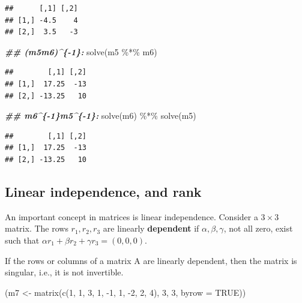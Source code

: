 \documentclass[
  12pt,
]{krantz}
\newenvironment{Shaded}{\begin{snugshade}}{\end{snugshade}}
\newcommand{\AttributeTok}[1]{\textcolor[rgb]{0.77,0.63,0.00}{#1}}
\newcommand{\ConstantTok}[1]{\textcolor[rgb]{0.00,0.00,0.00}{#1}}
\newcommand{\DecValTok}[1]{\textcolor[rgb]{0.00,0.00,0.81}{#1}}
\newcommand{\DocumentationTok}[1]{\textcolor[rgb]{0.56,0.35,0.01}{\textbf{\textit{#1}}}}
\newcommand{\FunctionTok}[1]{\textcolor[rgb]{0.00,0.00,0.00}{#1}}
\newcommand{\NormalTok}[1]{#1}
\newcommand{\OtherTok}[1]{\textcolor[rgb]{0.56,0.35,0.01}{#1}}
\newcommand{\SpecialCharTok}[1]{\textcolor[rgb]{0.00,0.00,0.00}{#1}}
\theoremstyle{definition}
\theoremstyle{definition}
\theoremstyle{definition}
\theoremstyle{definition}
\theoremstyle{remark}
\begin{document}
\begin{verbatim}
##      [,1] [,2]
## [1,] -4.5    4
## [2,]  3.5   -3
\end{verbatim}

\begin{Shaded}
\begin{Highlighting}[]
\DocumentationTok{\#\# (m5m6)\^{}\{{-}1\}:}
\FunctionTok{solve}\NormalTok{(m5 }\SpecialCharTok{\%*\%}\NormalTok{ m6)}
\end{Highlighting}
\end{Shaded}

\begin{verbatim}
##        [,1] [,2]
## [1,]  17.25  -13
## [2,] -13.25   10
\end{verbatim}

\begin{Shaded}
\begin{Highlighting}[]
\DocumentationTok{\#\# m6\^{}\{{-}1\}m5\^{}\{{-}1\}:}
\FunctionTok{solve}\NormalTok{(m6) }\SpecialCharTok{\%*\%} \FunctionTok{solve}\NormalTok{(m5)}
\end{Highlighting}
\end{Shaded}

\begin{verbatim}
##        [,1] [,2]
## [1,]  17.25  -13
## [2,] -13.25   10
\end{verbatim}

\hypertarget{linear-independence-and-rank}{%
\subsection{Linear independence, and rank}\label{linear-independence-and-rank}}

An important concept in matrices is linear independence. Consider a \(3\times 3\) matrix.
The rows \(r_1, r_2, r_3\) are linearly \textbf{dependent} if
\(\alpha, \beta, \gamma\), not all zero, exist such that
\(\alpha r_1+ \beta r_2+ \gamma r_3 = (0,0,0)\).

If the rows or columns of a matrix A are linearly dependent, then the matrix is singular, i.e., it is not invertible.

\begin{Shaded}
\begin{Highlighting}[]
\NormalTok{(m7 }\OtherTok{\textless{}{-}} \FunctionTok{matrix}\NormalTok{(}\FunctionTok{c}\NormalTok{(}\DecValTok{1}\NormalTok{, }\DecValTok{1}\NormalTok{, }\DecValTok{3}\NormalTok{, }\DecValTok{1}\NormalTok{, }\SpecialCharTok{{-}}\DecValTok{1}\NormalTok{, }\DecValTok{1}\NormalTok{, }\SpecialCharTok{{-}}\DecValTok{2}\NormalTok{, }\DecValTok{2}\NormalTok{, }\DecValTok{4}\NormalTok{), }\DecValTok{3}\NormalTok{, }\DecValTok{3}\NormalTok{, }\AttributeTok{byrow =} \ConstantTok{TRUE}\NormalTok{))}
\end{Highlighting}
\end{Shaded}
\end{document}
